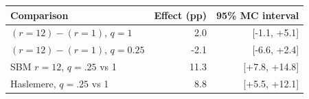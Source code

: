 \begin{tabular}{lrr}\toprule
Comparison & Effect (pp) & 95\% MC interval\\\midrule
$(r=12)-(r=1)$, $q=1$ & 2.0 & [-1.1, +5.1]\\
$(r=12)-(r=1)$, $q=0.25$ & -2.1 & [-6.6, +2.4]\\
SBM $r=12$, $q=.25$ vs 1 & 11.3 & [+7.8, +14.8]\\
Haslemere, $q=.25$ vs 1 & 8.8 & [+5.5, +12.1]\\
\bottomrule\end{tabular}
